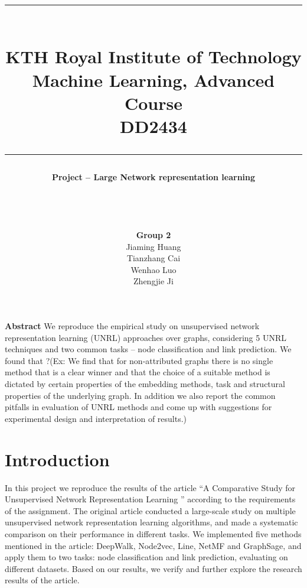 \documentclass[a4paper]{article}
\title{\rule[0.5cm]{\textwidth}{0.1mm}
\\KTH Royal Institute of Technology
\\\vspace{0.5em}
Machine Learning, Advanced Course
\\\vspace{0.5em}
DD2434
\\\rule[0cm]{\textwidth}{0.1mm}\vspace{4em}}
\author
{\Large\textbf{{Project -- Large Network representation learning}}
\\\\\\\\\\\vspace{0.5em}
\Large{\textbf{Group 2}}\\\vspace{0.2em}
\Large{Jiaming Huang}\\\vspace{0.2em}
\Large{Tianzhang Cai}\\\vspace{0.2em}
\Large{Wenhao Luo}\\\vspace{0.2em}
\Large{Zhengjie Ji}
\\\vspace{2em}}
\begin{document}
\maketitle
\thispagestyle{empty}



\vspace{1em}\noindent \textbf{Abstract} We reproduce the empirical study on unsupervised network representation learning (UNRL) approaches over graphs, considering 5 UNRL techniques and two common tasks – node classification and link prediction. We found that ?(Ex:  We find that for non-attributed graphs there is no single method that is a clear winner and that the choice of a suitable method is dictated by certain properties of the embedding methods, task and structural properties of the underlying graph. In addition we also report the common pitfalls in evaluation of UNRL methods and come up with suggestions for experimental design and interpretation of results.)

\newpage
\setcounter{page}{1}


\section{Introduction}





\noindent In this project we reproduce the results of the article “A Comparative Study for Unsupervised Network Representation Learning \cite{a}” according to the requirements of the assignment. The original article conducted a large-scale study on multiple unsupervised network representation learning algorithms, and made a systematic comparison on their performance in different tasks. We implemented five methods mentioned in the article: DeepWalk, Node2vec, Line, NetMF and GraphSage, and apply them to two tasks: node classification and link prediction, evaluating on different datasets. Based on our results, we verify and further explore the research results of the article.
\end{document}
